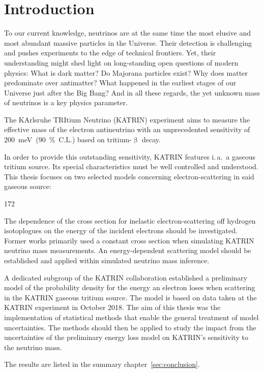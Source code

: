 \chapter{Introduction}
To our current knowledge, neutrinos are at the same time the most elusive and most abundant massive particles in the Universe. Their detection is challenging and pushes experiments to the edge of technical frontiers. Yet, their understanding might shed light on long-standing open questions of modern physics: What is dark matter? Do Majorana particles exist? Why does matter predominate over antimatter? What happened in the earliest stages of our Universe just after the Big Bang? And in all these regards, the yet unknown mass of neutrinos is a key physics parameter.

The KArlsruhe TRItium Neutrino (KATRIN) experiment aims to measure the effective mass of the electron antineutrino with an unprecedented sensitivity of \mbox{\SI{200}{meV} (\SI{90}{\percent} C.L.)} based on tritium-$\upbeta$ decay. 

In order to provide this outstanding sensitivity, KATRIN features i.\,a.~a gaseous tritium source. Its special characteristics must be well controlled and understood. This thesis focuses on two selected models concerning electron-scattering in said gaseous source: 
\begin{dingautolist}{172}
	\item\label{itm:introductionEDepCrossSec} The dependence of the cross section for inelastic electron-scattering off hydrogen isotoplogues on the energy of the incident electrons should be investigated. Former works primarily used a constant cross section when simulating KATRIN neutrino mass measurements. An energy-dependent scattering model should be established and applied within simulated neutrino mass inference.
	\item\label{itm:introductionKatrinEloss} A dedicated subgroup of the KATRIN collaboration established a preliminary model of the probability density for the energy an electron loses when scattering in the KATRIN gaseous tritium source. The model is based on data taken at the KATRIN experiment in October 2018. The aim of this thesis was the implementation of statistical methods that enable the general treatment of model uncertainties. The methods should then be applied to study the impact from the uncertainties of the preliminary energy loss model on KATRIN's sensitivity to the neutrino mass.
\end{dingautolist}
The results are listed in the summary chapter~\ref{sec:conclusion}.

